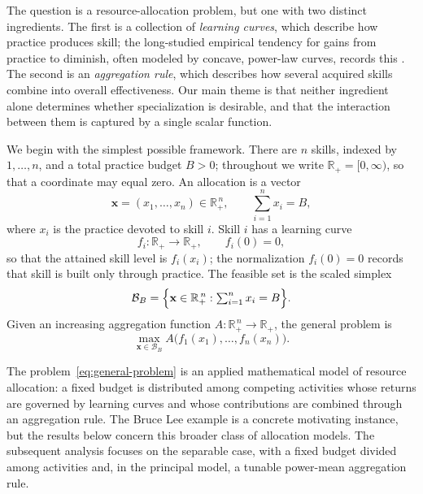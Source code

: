 \documentclass[11pt]{article}
\theoremstyle{definition}
\theoremstyle{remark}
\newcommand{\Rplus}{\mathbb{R}_{+}}
\newcommand{\vx}{\mathbf{x}}
\newcommand{\simplex}{\mathcal{B}}
\begin{document}
The question is a resource-allocation problem, but one with two
distinct ingredients.  The first is a collection of \emph{learning
curves}, which describe how practice produces skill; the long-studied
empirical tendency for gains from practice to diminish, often modeled
by concave, power-law curves, records this \citep{newell1981practice}.
The second is an \emph{aggregation rule}, which describes how several
acquired skills combine into overall effectiveness.  Our main theme is
that neither ingredient alone determines whether specialization is
desirable, and that the interaction between them is captured by a
single scalar function.

We begin with the simplest possible framework.  There are \(n\) skills,
indexed by \(1,\ldots,n\), and a total practice budget \(B>0\); throughout
we write \(\Rplus=[0,\infty)\), so that a coordinate may equal zero. An
allocation is a vector
\[
    \vx=(x_1,\ldots,x_n)\in\Rplus^{\,n},
    \qquad
    \sum_{i=1}^n x_i=B,
\]
where \(x_i\) is the practice devoted to skill \(i\). Skill \(i\) has a
learning curve
\[
    f_i:\Rplus\longrightarrow\Rplus,
    \qquad
    f_i(0)=0,
\]
so that the attained skill level is \(f_i(x_i)\); the normalization
\(f_i(0)=0\) records that skill is built only through practice. The
feasible set is the scaled simplex
\[
    \simplex_B
    =
    \Bigl\{
        \vx\in\Rplus^{\,n}:
        \textstyle\sum_{i=1}^n x_i=B
    \Bigr\}.
\]
Given an increasing aggregation function \(A:\Rplus^{\,n}\to\Rplus\), the
general problem is
\begin{equation}
    \max_{\vx\in\simplex_B}
    A\bigl(f_1(x_1),\ldots,f_n(x_n)\bigr).
    \label{eq:general-problem}
\end{equation}

The problem~\eqref{eq:general-problem} is an applied mathematical
model of resource allocation: a fixed budget is distributed among
competing activities whose returns are governed by learning curves and
whose contributions are combined through an aggregation rule. The
Bruce Lee example is a concrete motivating instance, but the results
below concern this broader class of allocation models. The subsequent
analysis focuses on the separable case, with a fixed budget divided
among activities and, in the principal model, a tunable power-mean
aggregation rule.
 
\end{document}
